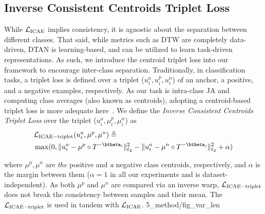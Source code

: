 \subsection{Inverse Consistent Centroids Triplet Loss}\label{Sec:Method:Subsec:Triplet}
While $\mathcal{L}_{\mathrm{ICAE}}$ implies consistency, it is agnostic about the separation between different classes.
That said, while metrics such as DTW are completely data-driven, DTAN is learning-based, and can be utilized to learn 
task-driven representations. As such, we introduce the centroid triplet loss into our framework to encourage inter-class separation. Traditionally, \eg in classification tasks, a triplet loss is defined over a triplet ($u^{a}_i, u^p_i, u^n_i$) of an anchor, a positive, and a negative examples, respectively. As our task is intra-class JA and computing class averages (also known as centroids), adopting a centroid-based triplet loss is more adequate here~\cite{doras:2020:prototypical}. We define the \textit{Inverse Consistent Centroids Triplet Loss}  over the triplet ($u^{a}_i,  \mu^p_i,  \mu^n_i$) as 
\begin{align}\label{eq:triplet}
\begin{split}
    &\Lcal_{\mathrm{ICAE-triplet}}(u^{a}_i,  \mu^p,  \mu^n)\triangleq \\ 
    &\max(0, \|u^a_i -  \mu^p\circ T^{- \btheta_i}\|_{\ell _2}^{2} - \|u^a_i -  \mu^n\circ T^{- \btheta_i}\|_{\ell _2}^{2} + \alpha)
\end{split}
\end{align}

where $ \mu^p,  \mu^n$ are \emph{the} positive and \emph{a} negative class centroids, respectively, and $\alpha$ is the margin between them ($\alpha=1$ in all our experiments and is dataset-independent). As both $ \mu^p$ and $ \mu^n$ are compared via an inverse warp, $\mathcal{L}_{\mathrm{ICAE-triplet}}$ does not break the consistency between samples and their mean. The $\mathcal{L}_{\mathrm{ICAE-triplet}}$ is used in tandem with $\mathcal{L}_{\mathrm{ICAE}}$. 
{5_method/fig_var_len}
